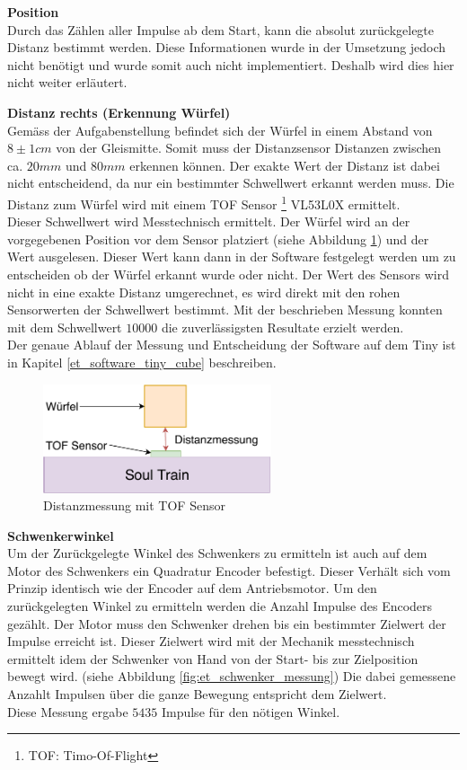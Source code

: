 \documentclass[../../main.tex]{subfiles}
\begin{document}
    \textbf{Position}\\
    Durch das Zählen aller Impulse ab dem Start, kann die absolut zurückgelegte Distanz bestimmt werden. Diese Informationen wurde in der Umsetzung jedoch nicht benötigt und wurde somit auch nicht implementiert. Deshalb wird dies hier nicht weiter erläutert.

    
    \textbf{Distanz rechts (Erkennung Würfel) }\\
    Gemäss der Aufgabenstellung befindet sich der Würfel in einem Abstand von $8\pm1cm$ von der Gleismitte. Somit muss der Distanzsensor Distanzen zwischen ca. $20mm$ und $80mm$ erkennen können. Der exakte Wert der Distanz ist dabei nicht entscheidend, da nur ein bestimmter Schwellwert erkannt werden muss. Die Distanz zum Würfel wird mit einem TOF Sensor \footnote{TOF: Timo-Of-Flight} VL53L0X ermittelt. \\
    Dieser Schwellwert wird Messtechnisch ermittelt. Der Würfel wird an der vorgegebenen Position vor dem Sensor platziert (siehe Abbildung \ref{fig:et_tof_messung}) und der Wert ausgelesen. Dieser Wert kann dann in der Software festgelegt werden um zu entscheiden ob der Würfel erkannt wurde oder nicht. Der Wert des Sensors wird nicht in eine exakte Distanz umgerechnet, es wird direkt mit den rohen Sensorwerten der Schwellwert bestimmt. Mit der beschrieben Messung konnten mit dem Schwellwert $10000$ die zuverlässigsten Resultate erzielt werden.\\
    Der genaue Ablauf der Messung und Entscheidung der Software auf dem Tiny ist in Kapitel \ref{et_software_tiny_cube} beschreiben.\\

    \begin{figure}[H]
        \centering
        \includegraphics[width=0.6\textwidth]{../../images/et/et_tof_messung.pdf}
        \caption {Distanzmessung mit TOF Sensor}
        \label{fig:et_tof_messung}
    \end{figure}

    \textbf{Schwenkerwinkel}\\
    Um der Zurückgelegte Winkel des Schwenkers zu ermitteln ist auch auf dem Motor des Schwenkers ein Quadratur Encoder befestigt. Dieser Verhält sich vom Prinzip identisch wie der Encoder auf dem Antriebsmotor. Um den zurückgelegten Winkel zu ermitteln werden die Anzahl Impulse des Encoders gezählt. Der Motor muss den Schwenker drehen bis ein bestimmter Zielwert der Impulse erreicht ist. Dieser Zielwert wird mit der Mechanik messtechnisch ermittelt idem der Schwenker von Hand von der Start- bis zur Zielposition bewegt wird. (siehe Abbildung \ref{fig:et_schwenker_messung}) Die dabei gemessene Anzahlt Impulsen über die ganze Bewegung entspricht dem Zielwert.\\
    Diese Messung ergabe $5435$ Impulse für den nötigen Winkel.
\end{document}
